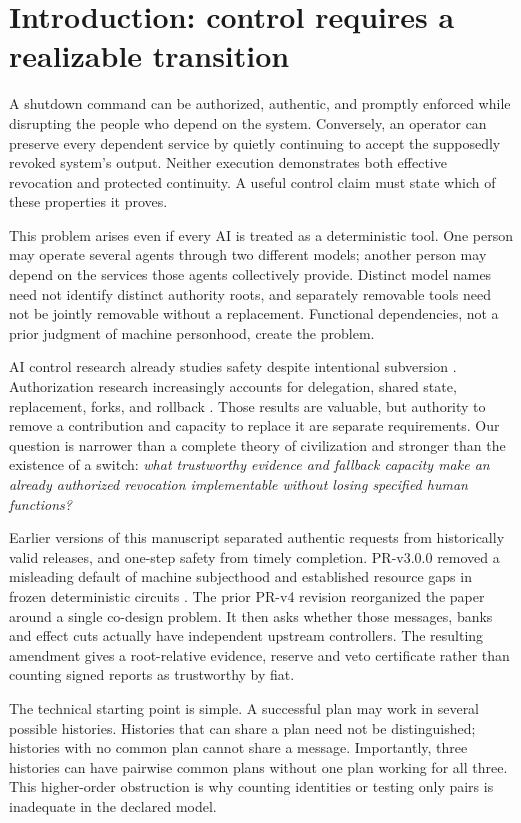\documentclass[11pt,a4paper]{article}
\theoremstyle{definition}\newtheorem{definition}{Definition}
\begin{document}
\section{Introduction: control requires a realizable transition}
A shutdown command can be authorized, authentic, and promptly enforced while disrupting the people who depend on the system. Conversely, an operator can preserve every dependent service by quietly continuing to accept the supposedly revoked system's output. Neither execution demonstrates both effective revocation and protected continuity. A useful control claim must state which of these properties it proves.

This problem arises even if every AI is treated as a deterministic tool. One person may operate several agents through two different models; another person may depend on the services those agents collectively provide. Distinct model names need not identify distinct authority roots, and separately removable tools need not be jointly removable without a replacement. Functional dependencies, not a prior judgment of machine personhood, create the problem.

AI control research already studies safety despite intentional subversion \cite{greenblatt}. Authorization research increasingly accounts for delegation, shared state, replacement, forks, and rollback \cite{muruaga,zhu}. Those results are valuable, but authority to remove a contribution and capacity to replace it are separate requirements. Our question is narrower than a complete theory of civilization and stronger than the existence of a switch: \emph{what trustworthy evidence and fallback capacity make an already authorized revocation implementable without losing specified human functions?}

Earlier versions of this manuscript separated authentic requests from historically valid releases, and one-step safety from timely completion. PR-v3.0.0 removed a misleading default of machine subjecthood and established resource gaps in frozen deterministic circuits \cite{liu3}. The prior PR-v4 revision reorganized the paper around a single co-design problem. It then asks whether those messages, banks and effect cuts actually have independent upstream controllers. The resulting amendment gives a root-relative evidence, reserve and veto certificate rather than counting signed reports as trustworthy by fiat.

The technical starting point is simple. A successful plan may work in several possible histories. Histories that can share a plan need not be distinguished; histories with no common plan cannot share a message. Importantly, three histories can have pairwise common plans without one plan working for all three. This higher-order obstruction is why counting identities or testing only pairs is inadequate in the declared model.
\end{document}
